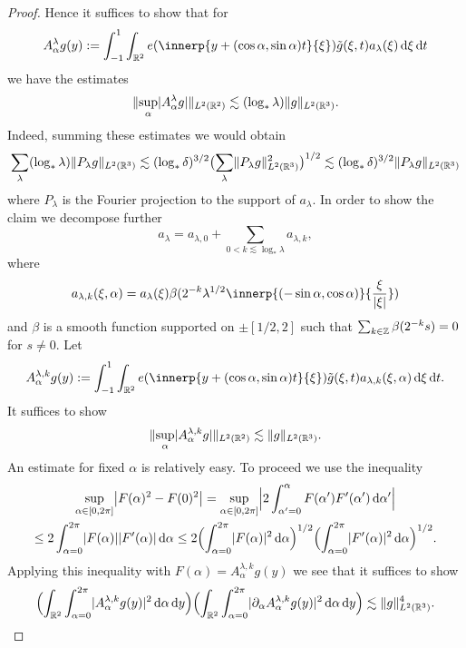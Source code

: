 \begin{proof}
Hence it suffices to show that for
\[
A_{\alpha}^{\lambda} g(y)
:=
\int_{-1}^{1} \int_{\R^{2}} e(\innerp{y+(\cos\alpha,\sin\alpha)t}{\xi}) \tilde{g}(\xi,t) a_{\lambda}(\xi) \dif \xi \dif t
\]
we have the estimates
\[
\norm{ \sup_{\alpha} \abs{A_{\alpha}^{\lambda} g}}_{L^{2}(\R^{2})}
\lesssim
(\log_{*} \lambda)
\norm{ g }_{L^{2}(\R^{3})}.
\]
Indeed, summing these estimates we would obtain
\[
\sum_{\lambda} (\log_{*} \lambda) \norm{ P_{\lambda} g }_{L^{2}(\R^{3})}
\lesssim
(\log_{*} \delta)^{3/2} \bigl( \sum_{\lambda} \norm{ P_{\lambda} g }_{L^{2}(\R^{3})}^{2} \bigr)^{1/2}
\lesssim
(\log_{*} \delta)^{3/2} \norm{ P_{\lambda} g }_{L^{2}(\R^{3})}
\]
where $P_{\lambda}$ is the Fourier projection to the support of $a_{\lambda}$.
In order to show the claim we decompose further
\[
a_{\lambda} = a_{\lambda,0} + \sum_{0<k\lesssim \log_{*}\lambda} a_{\lambda,k},
\]
where
\[
a_{\lambda,k}(\xi,\alpha) = a_{\lambda}(\xi) \beta(2^{-k}\lambda^{1/2}\innerp{(-\sin\alpha,\cos\alpha)}{\frac{\xi}{\abs{\xi}}})
\]
and $\beta$ is a smooth function supported on $\pm [1/2,2]$ such that $\sum_{k\in\Z} \beta(2^{-k}s)=0$ for $s\neq 0$.
Let
\[
A_{\alpha}^{\lambda,k} g(y)
:=
\int_{-1}^{1} \int_{\R^{2}} e(\innerp{y+(\cos\alpha,\sin\alpha)t}{\xi}) \tilde{g}(\xi,t) a_{\lambda,k}(\xi,\alpha) \dif \xi \dif t.
\]
It suffices to show
\[
\norm{ \sup_{\alpha} \abs{A_{\alpha}^{\lambda,k} g}}_{L^{2}(\R^{2})}
\lesssim
\norm{ g }_{L^{2}(\R^{3})}.
\]
An estimate for fixed $\alpha$ is relatively easy.
To proceed we use the inequality
\begin{multline*}
\sup_{\alpha \in [0,2\pi]} \abs[\big]{F(\alpha)^{2} - F(0)^{2}}
=
\sup_{\alpha \in [0,2\pi]} \abs[\Big]{ 2 \int_{\alpha'=0}^{\alpha} F(\alpha') F'(\alpha') \dif \alpha'}\\
\leq
2 \int_{\alpha=0}^{2\pi} \abs{F(\alpha)} \abs{F'(\alpha)} \dif \alpha
\leq
2 \Bigl( \int_{\alpha=0}^{2\pi} \abs{F(\alpha)}^{2} \dif \alpha \Bigr)^{1/2}
\Bigl( \int_{\alpha=0}^{2\pi} \abs{F'(\alpha)}^{2} \dif \alpha \Bigr)^{1/2}.
\end{multline*}
Applying this inequality with $F(\alpha)=A_{\alpha}^{\lambda,k}g(y)$ we see that it suffices to show
\begin{equation}
\label{eq:MSS92-sq-fct-after-Sobolev-emb}
\Bigl( \int_{\R^{2}} \int_{\alpha=0}^{2\pi} \abs{A_{\alpha}^{\lambda,k} g(y)}^{2} \dif \alpha \dif y \Bigr)
\Bigl( \int_{\R^{2}} \int_{\alpha=0}^{2\pi} \abs{\partial_{\alpha} A_{\alpha}^{\lambda,k} g(y)}^{2} \dif \alpha \dif y \Bigr)
\lesssim
\norm{ g }_{L^{2}(\R^{3})}^{4}.
\end{equation}

\end{proof}
